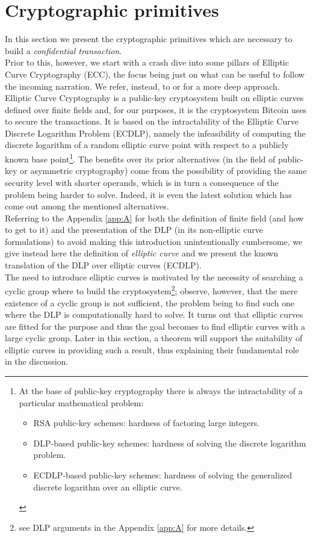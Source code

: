 \chapter{Cryptographic primitives}
\label{chpr:crypto_primitives}
In this section we present the cryptographic primitives which are necessary to build a \textit{confidential transaction}.\\
Prior to this, however, we start with a crash dive into some pillars of Elliptic Curve Cryptography (ECC), the focus being just on what can be useful to follow the incoming narration. We refer, instead, to \cite{Sec} or \cite{UnderstandingCrypto} for a more deep approach.\\
Elliptic Curve Cryptography is a public-key cryptosystem built on elliptic curves defined over finite fields and, for our purposes, it is the cryptosystem Bitcoin uses to secure the transactions. It is based on the intractability of the Elliptic Curve Discrete Logarithm Problem (ECDLP), namely the infeasibility of computing the discrete logarithm of a random elliptic curve point with respect to a publicly known base point\footnote{At the base of public-key cryptography there is always the intractability of a particular mathematical problem: \begin{itemize} \item RSA public-key schemes: hardness of factoring large integers. \item DLP-based public-key schemes: hardness of solving the discrete logarithm problem. \item ECDLP-based public-key schemes: hardness of solving the generalized discrete logarithm over an elliptic curve. \end{itemize}}. The benefits over its prior alternatives (in the field of public-key or asymmetric cryptography) come from the possibility of providing the same security level with shorter operands, which is in turn a consequence of the problem being harder to solve. Indeed, it is even the latest solution which has come out among the mentioned alternatives.\\
Referring to the Appendix \ref{app:A} for both the definition of finite field (and how to get to it) and the presentation of the DLP (in its non-elliptic curve formulations) to avoid making this introduction unintentionally cumbersome, we give instead here the definition of \textit{elliptic curve} and we present the known translation of the DLP over elliptic curves (ECDLP).\\ 
The need to introduce elliptic curves is motivated by the necessity of searching a cyclic group where to build the cryptosystem\footnote{see DLP arguments in the Appendix \ref{app:A} for more details.}; observe, however, that the mere existence of a cyclic group is not sufficient, the problem being to find such one where the DLP is computationally hard to solve. It turns out that elliptic curves are fitted for the purpose and thus the goal becomes to find elliptic curves with a large cyclic group. Later in this section, a theorem will support the suitability of elliptic curves in providing such a result, thus explaining their fundamental role in the discussion.\\
